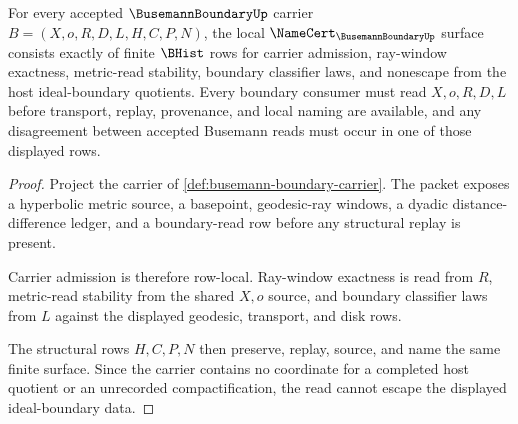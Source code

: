 \begin{theorem}
\label{thm:busemann-boundary-namecert-obligations}
For every accepted $\BusemannBoundaryUp$ carrier $B=(X,o,R,D,L,H,C,P,N)$, the local $\NameCert_{\BusemannBoundaryUp}$ surface consists exactly of finite $\BHist$ rows for carrier admission, ray-window exactness, metric-read stability, boundary classifier laws, and nonescape from the host ideal-boundary quotients. Every boundary consumer must read $X,o,R,D,L$ before transport, replay, provenance, and local naming are available, and any disagreement between accepted Busemann reads must occur in one of those displayed rows.
\end{theorem}
\begin{proof}
Project the carrier of \autoref{def:busemann-boundary-carrier}. The packet exposes a hyperbolic metric source, a basepoint, geodesic-ray windows, a dyadic distance-difference ledger, and a boundary-read row before any structural replay is present.

Carrier admission is therefore row-local. Ray-window exactness is read from $R$, metric-read stability from the shared $X,o$ source, and boundary classifier laws from $L$ against the displayed geodesic, transport, and disk rows.

The structural rows $H,C,P,N$ then preserve, replay, source, and name the same finite surface. Since the carrier contains no coordinate for a completed host quotient or an unrecorded compactification, the read cannot escape the displayed ideal-boundary data.
\end{proof}

